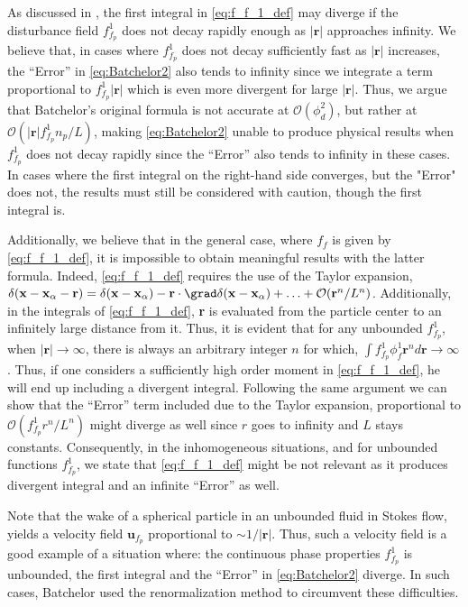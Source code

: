 As discussed in \citet{batchelor1972sedimentation}, the first integral in \ref{eq:f_f_1_def} may diverge if the disturbance field $f_{f_p}^1$ does not decay rapidly enough as $|\textbf{r}|$ approaches infinity. 
We believe that, in cases where $f_{f_p}^1$ does not decay sufficiently fast as $|\textbf{r}|$ increases, the ``Error'' in \ref{eq:Batchelor2} also tends to infinity since we integrate a term proportional to $f_{f_p}^1 |\textbf{r}|$ which is even more divergent for large $|\textbf{r}|$. 
Thus, we argue that Batchelor's original formula is not accurate at $\mathcal{O}(\phi_d^2)$, but rather at $\mathcal{O}(|\textbf{r}| f_{f_p}^1  n_p / L)$, making \ref{eq:Batchelor2} unable to produce physical results when $f_{f_p}^1$ does not decay rapidly since the ``Error'' also tends to infinity in these cases. 
In cases where the first integral on the right-hand side converges, but the "Error" does not, the results must still be considered with caution, though the first integral is. 


Additionally, we believe that in the general case, where $f_f$ is given by \ref{eq:f_f_1_def}, it is impossible to obtain meaningful results with the latter formula. 
Indeed, \ref{eq:f_f_1_def} requires the use of the Taylor expansion, $\delta(\textbf{x} - \textbf{x}_\alpha - \textbf{r}) =\delta(\textbf{x} - \textbf{x}_\alpha) - \textbf{r}\cdot \grad\delta(\textbf{x} - \textbf{x}_\alpha)+ \ldots + \mathcal{O}(\textbf{r}^n/L^n)$. 
Additionally, in the integrals of \ref{eq:f_f_1_def}, \textbf{r} is evaluated from the particle center to an infinitely large distance from it.
Thus, it is evident that for any unbounded $f_{f_p}^1$, when $|\textbf{r}| \to \infty$, there is always an arbitrary integer $n$ for which, $\int f_{f_p}^1 \phi^1_f \textbf{r}^n d\textbf{r} \to \infty$.
Thus, if one considers a sufficiently high order moment in \ref{eq:f_f_1_def}, he will end up including a divergent integral. 
Following the same argument we can show that the  ``Error'' term included due to the Taylor expansion, proportional to $\mathcal{O}(f_{f_p}^1 r^n /L^n)$ might diverge as well since $r$ goes to infinity and $L$ stays constants. 
Consequently, in the inhomogeneous situations, and for unbounded functions $f_{f_p}^1$, we state that \ref{eq:f_f_1_def} might be not relevant as it produces divergent integral and an infinite ``Error'' as well. 

Note that the wake of a spherical particle in an unbounded fluid in Stokes flow, yields a velocity field $\textbf{u}_{f_p}$ proportional to  $\sim 1/|\textbf{r}|$. 
Thus, such a velocity field is a good example of a situation where: the continuous phase properties $f_{f_p}^1$ is unbounded, the first integral and the ``Error'' in \ref{eq:Batchelor2} diverge. 
In such cases, Batchelor used the renormalization method to circumvent these difficulties. 


